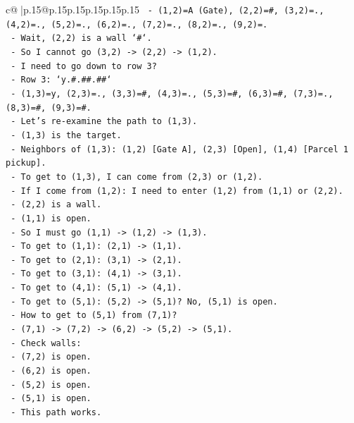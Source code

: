 \documentclass{article}
\begin{document}
{\begin{supertabular}{c@{$\;$}|p{.15\linewidth}@{}p{.15\linewidth}p{.15\linewidth}p{.15\linewidth}p{.15\linewidth}p{.15\linewidth}}
{{{\texttt{    {-} (1,2)=A (Gate), (2,2)=\#, (3,2)=., (4,2)=., (5,2)=., (6,2)=., (7,2)=., (8,2)=., (9,2)=.} \\
\texttt{  {-} Wait, (2,2) is a wall `\#`.} \\
\texttt{  {-} So I cannot go (3,2) {-}> (2,2) {-}> (1,2).} \\
\texttt{  {-} I need to go down to row 3?} \\
\texttt{  {-} Row 3: `y.\#.\#\#.\#\#`} \\
\texttt{    {-} (1,3)=y, (2,3)=., (3,3)=\#, (4,3)=., (5,3)=\#, (6,3)=\#, (7,3)=., (8,3)=\#, (9,3)=\#.} \\
\texttt{  {-} Let's re{-}examine the path to (1,3).} \\
\texttt{  {-} (1,3) is the target.} \\
\texttt{  {-} Neighbors of (1,3): (1,2) {[}Gate A{]}, (2,3) {[}Open{]}, (1,4) {[}Parcel 1 pickup{]}.} \\
\texttt{  {-} To get to (1,3), I can come from (2,3) or (1,2).} \\
\texttt{  {-} If I come from (1,2): I need to enter (1,2) from (1,1) or (2,2).} \\
\texttt{    {-} (2,2) is a wall.} \\
\texttt{    {-} (1,1) is open.} \\
\texttt{    {-} So I must go (1,1) {-}> (1,2) {-}> (1,3).} \\
\texttt{    {-} To get to (1,1): (2,1) {-}> (1,1).} \\
\texttt{    {-} To get to (2,1): (3,1) {-}> (2,1).} \\
\texttt{    {-} To get to (3,1): (4,1) {-}> (3,1).} \\
\texttt{    {-} To get to (4,1): (5,1) {-}> (4,1).} \\
\texttt{    {-} To get to (5,1): (5,2) {-}> (5,1)? No, (5,1) is open.} \\
\texttt{    {-} How to get to (5,1) from (7,1)?} \\
\texttt{      {-} (7,1) {-}> (7,2) {-}> (6,2) {-}> (5,2) {-}> (5,1).} \\
\texttt{      {-} Check walls:} \\
\texttt{        {-} (7,2) is open.} \\
\texttt{        {-} (6,2) is open.} \\
\texttt{        {-} (5,2) is open.} \\
\texttt{        {-} (5,1) is open.} \\
\texttt{      {-} This path works.} \\
}}}
\end{supertabular}}
\end{document}
